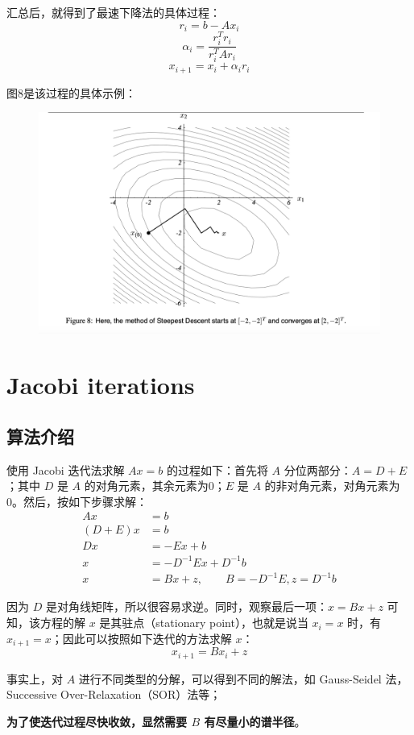 \documentclass[12pt]{article}
\begin{document}
汇总后，就得到了最速下降法的具体过程：
$$
r_i = b - Ax_i
$$
$$
\alpha_i = \frac{r^T_i r_i }{r^T_i A r_i}
$$
$$
x_{i+1} = x_i + \alpha_i r_i
$$

图8是该过程的具体示例：
\begin{figure}[H]
    \centering
    \includegraphics[width=.8\textwidth]{fig/CG_Plot_SD_3.png}
\end{figure}

\section{Jacobi iterations}
\subsection{算法介绍}
使用 Jacobi 迭代法求解 $Ax = b$ 的过程如下：首先将 $A$ 分位两部分：$A = D + E$；其中 $D$ 是 $A$ 的对角元素，其余元素为0；$E$ 是 $A$ 的非对角元素，对角元素为0。然后，按如下步骤求解：
\begin{align*}
Ax &= b \\
(D+E) x &= b \\
Dx &= -Ex + b \\
x &= -D^{-1}Ex + D^{-1}b \\
x &= Bx + z, \qquad B = -D^{-1}E, z = D^{-1}b
\end{align*}

因为 $D$ 是对角线矩阵，所以很容易求逆。同时，观察最后一项：$x = Bx + z$ 可知，该方程的解 $x$ 是其驻点（stationary point），也就是说当 $x_i = x$ 时，有 $x_{i+1} = x$；因此可以按照如下迭代的方法求解 $x$：
$$
x_{i+1} = Bx_i + z
$$

事实上，对 $A$ 进行不同类型的分解，可以得到不同的解法，如 Gauss-Seidel 法，Successive Over-Relaxation（SOR）法等；

\textbf{为了使迭代过程尽快收敛，显然需要 $B$ 有尽量小的谱半径}。
\end{document}
